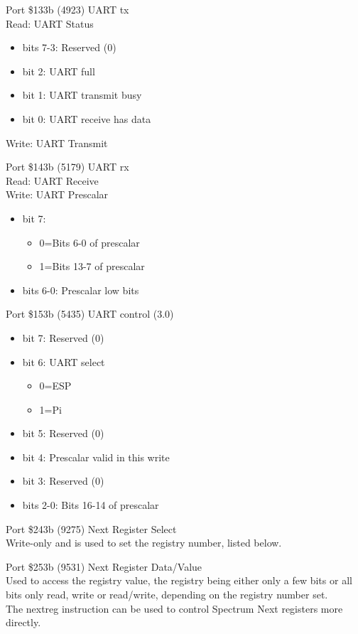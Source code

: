 Port \$133b (4923) UART tx\\
Read: UART Status\\
\begin{itemize}
\item[] bits 7-3: Reserved (0)
\item[] bit 2: UART full
\item[] bit 1: UART transmit busy
\item[] bit 0: UART receive has data
\end{itemize}
Write: UART Transmit

Port \$143b (5179) UART rx\\
Read: UART Receive\\
Write: UART Prescalar
\begin{itemize}
\item[] bit 7:
  \begin{itemize}
  \item[] 0=Bits 6-0 of prescalar
  \item[] 1=Bits 13-7 of prescalar
  \end{itemize}
\item[] bits 6-0: Prescalar low bits
\end{itemize}

Port \$153b (5435) UART control (3.0)
\begin{itemize}
\item[] bit 7: Reserved (0)
\item[] bit 6: UART select
  \begin{itemize}
  \item[] 0=ESP
  \item[] 1=Pi
  \end{itemize}
\item[] bit 5: Reserved (0)
\item[] bit 4: Prescalar valid in this write
\item[] bit 3: Reserved (0)
\item[] bits 2-0: Bits 16-14 of prescalar
\end{itemize}

Port \$243b (9275) Next Register Select\\
Write-only and is used to set the registry number, listed below.

Port \$253b (9531) Next Register Data/Value\\
Used to access the registry value, the registry being either only a
few bits or all bits only read, write or read/write, depending on the
registry number set.\\
The nextreg instruction can be used to control Spectrum Next registers
more directly.

